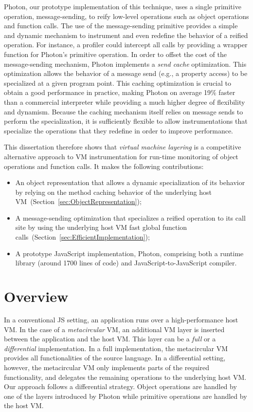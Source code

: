Photon, our prototype implementation of this technique, uses a single primitive
operation, message-sending, to reify low-level operations such as object
operations and function calls. The use of the message-sending primitive
provides a simple and dynamic mechanism to instrument and even redefine the
behavior of a reified operation. For instance, a profiler could intercept all
calls by providing a wrapper function for Photon's  primitive
operation. In order to offset the cost of the message-sending mechanism, Photon
implements a {\it send cache} optimization. This optimization allows the behavior of
a message send (e.g., a property access) to be specialized at a given program
point. This caching optimization is crucial to obtain a good performance in
practice, making Photon on average 19\% faster than a commercial interpreter
while providing a much higher degree of flexibility and dynamism. Because the
caching mechanism itself relies on message sends to perform the
specialization, it is sufficiently flexible to allow instrumentations that
specialize the operations that they redefine in order to improve performance.

This dissertation therefore shows that \emph{virtual machine layering} is a
competitive alternative approach to VM instrumentation for run-time monitoring
of object operations and function calls. It makes the following contributions:
\begin{itemize}
    \item An object representation that allows a dynamic specialization of its
        behavior by relying on the method caching behavior of the underlying
        host VM~(Section~\ref{sec:ObjectRepresentation});
    \item A message-sending optimization that specializes a reified operation
        to its call site by using the underlying host VM fast global function
        calls~(Section~\ref{sec:EfficientImplementation});
    \item A prototype JavaScript implementation, Photon, comprising both a runtime
        library (around 1700 lines of code) and JavaScript-to-JavaScript compiler.
\end{itemize}

\section{Overview}

In a conventional JS setting, an application runs over a high-performance host
VM. In the case of a \emph{metacircular} VM, an additional VM layer is
inserted between the application and the host VM. This layer can be a
\emph{full} or a \emph{differential} implementation. In a full implementation,
the metacircular VM provides all functionalities of the source language. In a
differential setting, however, the metacircular VM only implements parts of
the required functionality, and delegates the remaining operations to the
underlying host VM. Our approach follows a differential strategy.
Object
 operations are handled by one of the layers introduced by
Photon while primitive operations are handled by the host VM.

